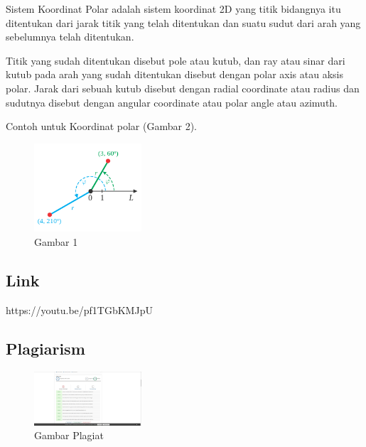 \begin{itemize}
\begin{enumerate}
Sistem Koordinat Polar adalah sistem koordinat 2D yang titik bidangnya itu ditentukan dari jarak titik yang telah ditentukan dan suatu sudut dari arah yang sebelumnya telah ditentukan.

Titik yang sudah ditentukan disebut pole atau kutub, dan ray atau sinar dari kutub pada arah yang sudah ditentukan disebut dengan polar axis atau aksis polar. Jarak dari sebuah kutub disebut dengan radial coordinate atau radius dan sudutnya disebut dengan angular coordinate atau polar angle atau azimuth.

Contoh untuk Koordinat polar (Gambar 2).
	\begin{figure}[H]
	\includegraphics[width=4cm]{figures/Tugas1/1174070/polar.png}
	\centering
	\caption{Gambar 1}
\end{figure}
	\end{enumerate}
\end{itemize}
\subsection{Link}
https://youtu.be/pf1TGbKMJpU
\subsection{Plagiarism}
\begin{figure}[H]
	\includegraphics[width=4cm]{figures/Tugas1/1174070/plagiat.jpg}
	\centering
	\caption{Gambar Plagiat}
\end{figure}
